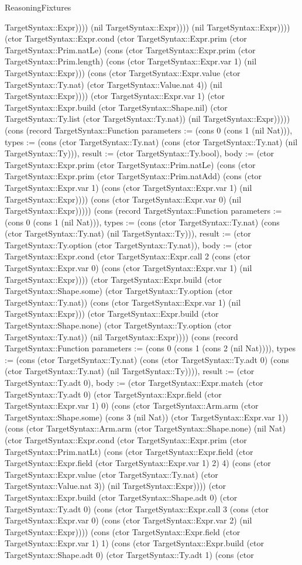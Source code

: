 \begin{lexlean}{ReasoningFixtures}
\begin{semanticmodule}
{TargetSyntax::Expr)))) (nil TargetSyntax::Expr)))) (nil TargetSyntax::Expr)))) (ctor TargetSyntax::Expr.cond (ctor TargetSyntax::Expr.prim (ctor TargetSyntax::Prim.natLe) (cons (ctor TargetSyntax::Expr.prim (ctor TargetSyntax::Prim.length) (cons (ctor TargetSyntax::Expr.var 1) (nil TargetSyntax::Expr))) (cons (ctor TargetSyntax::Expr.value (ctor TargetSyntax::Ty.nat) (ctor TargetSyntax::Value.nat 4)) (nil TargetSyntax::Expr)))) (ctor TargetSyntax::Expr.var 1) (ctor TargetSyntax::Expr.build (ctor TargetSyntax::Shape.nil) (ctor TargetSyntax::Ty.list (ctor TargetSyntax::Ty.nat)) (nil TargetSyntax::Expr))))}) (cons (record TargetSyntax::Function {parameters := (cons 0 (cons 1 (nil Nat))), types := (cons (ctor TargetSyntax::Ty.nat) (cons (ctor TargetSyntax::Ty.nat) (nil TargetSyntax::Ty))), result := (ctor TargetSyntax::Ty.bool), body := (ctor TargetSyntax::Expr.prim (ctor TargetSyntax::Prim.natLe) (cons (ctor TargetSyntax::Expr.prim (ctor TargetSyntax::Prim.natAdd) (cons (ctor TargetSyntax::Expr.var 1) (cons (ctor TargetSyntax::Expr.var 1) (nil TargetSyntax::Expr)))) (cons (ctor TargetSyntax::Expr.var 0) (nil TargetSyntax::Expr))))}) (cons (record TargetSyntax::Function {parameters := (cons 0 (cons 1 (nil Nat))), types := (cons (ctor TargetSyntax::Ty.nat) (cons (ctor TargetSyntax::Ty.nat) (nil TargetSyntax::Ty))), result := (ctor TargetSyntax::Ty.option (ctor TargetSyntax::Ty.nat)), body := (ctor TargetSyntax::Expr.cond (ctor TargetSyntax::Expr.call 2 (cons (ctor TargetSyntax::Expr.var 0) (cons (ctor TargetSyntax::Expr.var 1) (nil TargetSyntax::Expr)))) (ctor TargetSyntax::Expr.build (ctor TargetSyntax::Shape.some) (ctor TargetSyntax::Ty.option (ctor TargetSyntax::Ty.nat)) (cons (ctor TargetSyntax::Expr.var 1) (nil TargetSyntax::Expr))) (ctor TargetSyntax::Expr.build (ctor TargetSyntax::Shape.none) (ctor TargetSyntax::Ty.option (ctor TargetSyntax::Ty.nat)) (nil TargetSyntax::Expr)))}) (cons (record TargetSyntax::Function {parameters := (cons 0 (cons 1 (cons 2 (nil Nat)))), types := (cons (ctor TargetSyntax::Ty.nat) (cons (ctor TargetSyntax::Ty.adt 0) (cons (ctor TargetSyntax::Ty.nat) (nil TargetSyntax::Ty)))), result := (ctor TargetSyntax::Ty.adt 0), body := (ctor TargetSyntax::Expr.match (ctor TargetSyntax::Ty.adt 0) (ctor TargetSyntax::Expr.field (ctor TargetSyntax::Expr.var 1) 0) (cons (ctor TargetSyntax::Arm.arm (ctor TargetSyntax::Shape.some) (cons 3 (nil Nat)) (ctor TargetSyntax::Expr.var 1)) (cons (ctor TargetSyntax::Arm.arm (ctor TargetSyntax::Shape.none) (nil Nat) (ctor TargetSyntax::Expr.cond (ctor TargetSyntax::Expr.prim (ctor TargetSyntax::Prim.natLt) (cons (ctor TargetSyntax::Expr.field (ctor TargetSyntax::Expr.field (ctor TargetSyntax::Expr.var 1) 2) 4) (cons (ctor TargetSyntax::Expr.value (ctor TargetSyntax::Ty.nat) (ctor TargetSyntax::Value.nat 3)) (nil TargetSyntax::Expr)))) (ctor TargetSyntax::Expr.build (ctor TargetSyntax::Shape.adt 0) (ctor TargetSyntax::Ty.adt 0) (cons (ctor TargetSyntax::Expr.call 3 (cons (ctor TargetSyntax::Expr.var 0) (cons (ctor TargetSyntax::Expr.var 2) (nil TargetSyntax::Expr)))) (cons (ctor TargetSyntax::Expr.field (ctor TargetSyntax::Expr.var 1) 1) (cons (ctor TargetSyntax::Expr.build (ctor TargetSyntax::Shape.adt 0) (ctor TargetSyntax::Ty.adt 1) (cons (ctor }
\end{semanticmodule}
\end{lexlean}
